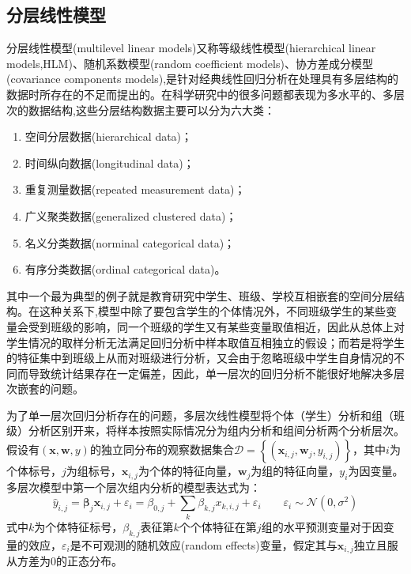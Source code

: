 \documentclass[a4paper]{ctexart}
\begin{document}
\begin{spacing}{1.3}
	\section{分层线性模型}
	分层线性模型(multilevel linear models)\cite{RN84}\cite{RN85}又称等级线性模型(hierarchical linear models,HLM)\cite{RN76}、随机系数模型(random coefficient models)\cite{RN86}、协方差成分模型(covariance components models)\cite{RN87},是针对经典线性回归分析在处理具有多层结构的数据时所存在的不足而提出的。在科学研究中的很多问题都表现为多水平的、多层次的数据结构,这些分层结构数据主要可以分为六大类\cite{RN83}：
	\begin{enumerate}[itemindent=2em,label=(\arabic*)]
		\item 空间分层数据(hierarchical data)；
		\item 时间纵向数据(longitudinal data)；
		\item 重复测量数据(repeated measurement data)；
		\item 广义聚类数据(generalized clustered data)；
		\item 名义分类数据(norminal categorical data)；
		\item 有序分类数据(ordinal  categorical data)。
	\end{enumerate}
	其中一个最为典型的例子就是教育研究中学生、班级、学校互相嵌套的空间分层结构。在这种关系下,模型中除了要包含学生的个体情况外，不同班级学生的某些变量会受到班级的影响，同一个班级的学生又有某些变量取值相近，因此从总体上对学生情况的取样分析无法满足回归分析中样本取值互相独立的假设；而若是将学生的特征集中到班级上从而对班级进行分析，又会由于忽略班级中学生自身情况的不同而导致统计结果存在一定偏差\cite{RN75}，因此，单一层次的回归分析不能很好地解决多层次嵌套的问题。
	
	为了单一层次回归分析存在的问题，多层次线性模型将个体（学生）分析和组（班级）分析区别开来，将样本按照实际情况分为组内分析和组间分析两个分析层次。假设有$(\bm{x},\bm{w},y)$的独立同分布的观察数据集合$\mathcal{D}=\left\{(\bm{x}_{i,j},\bm{w}_j,y_{i,j})\right\}$，其中$i$为个体标号，$j$为组标号，$\bm{x}_{i,j}$为个体的特征向量，$\bm{w}_j$为组的特征向量，$y_i$为因变量。多层次模型中第一个层次组内分析的模型表达式为\cite{RN83}：
	\begin{equation}\label{eq:mul-lin-1}
	\hat{y}_{i,j}=\bm\beta_{j}\bm{x}_{i,j}+\varepsilon_{i}=\beta_{0,j}+\sum_{k}\beta_{k,j}x_{k,i,j}+\varepsilon_{i}
	\qquad \varepsilon_{i}\sim\mathcal{N}(0,\sigma^2)
	\end{equation}
	式中$k$为个体特征标号，$\beta_{k,j}$表征第$k$个个体特征在第$j$组的水平预测变量对于因变量的效应，$\varepsilon_{i}$是不可观测的随机效应(random effects)变量，假定其与$\bm x_{i,j}$独立且服从方差为0的正态分布。
	

\end{spacing}
\end{document}
